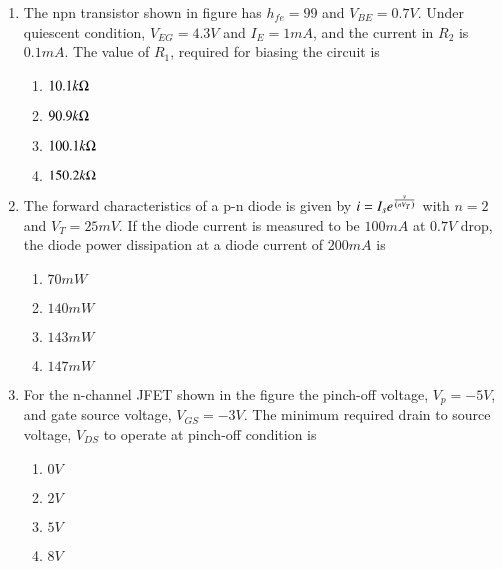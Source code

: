\documentclass[journal]{IEEEtran}
\begin{document}
\begin{enumerate}
    \item The npn transistor shown in figure has $h_{fe}=99$ and $V_{BE}=0.7V$. Under quiescent condition, $V_{EG}=4.3V$ and $I_{E}=1mA$, and the current in $R_2$ is $0.1 mA$. The value of $R_1$, required for biasing the circuit is
        \begin{figure}[!ht]
            \centering
            
        \end{figure}
        \begin{enumerate}
            \item $10.1k\ohm$
            \item $90.9k\ohm$
            \item $100.1k\ohm$
            \item $150.2k\ohm$
        \end{enumerate}

    \item The forward characteristics of a p-n diode is given by $i=I_{s}e^{\frac{v}{\left(nV_{T}\right)}}$ with $n=2$ and $V_{T}=25mV$. If the diode current is measured to be $100mA$ at $0.7V$ drop, the diode power dissipation at a diode current of $200mA$ is 
        \begin{enumerate}
            \item $70mW$
            \item $140mW$
            \item $143mW$
            \item $147mW$
        \end{enumerate}

    \item For the n-channel JFET shown in the figure the pinch-off voltage, $V_{p}=-5V$, and gate source voltage, $V_{GS}=-3V$. The minimum required drain to source voltage, $V_{DS}$ to operate at pinch-off condition is
        \begin{figure}[!ht]
            \centering
            
        \end{figure}
        \begin{enumerate}
            \item $0V$
            \item $2V$
            \item $5V$
            \item $8V$
        \end{enumerate}


\end{enumerate}
\end{document}

